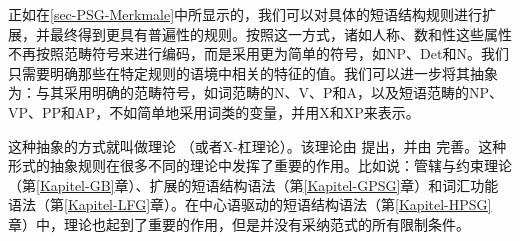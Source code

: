 正如在\ref{sec-PSG-Merkmale}中所显示的，我们可以对具体的短语结构规则进行扩展，并最终得到更具有普遍性的规则。按照这一方式，诸如人称、数和性这些属性不再按照范畴符号来进行编码，而是采用更为简单的符号，如NP、Det和N。我们只需要明确那些在特定规则的语境中相关的特征的值。我们可以进一步将其抽象为：与其采用明确的范畴符号，如词范畴的N、V、P和A，以及短语范畴的NP、VP、PP和AP，不如简单地采用词类的变量，并用X和XP来表示。

这种抽象的方式就叫做\xbarc 理论 （或者X-杠理论）。该理论由 \citet{Chomsky70a}提出，并由 \citet{Jackendoff77a}完善。这种形式的抽象规则在很多不同的理论中发挥了重要的作用。比如说：管辖与约束理论\indexgb（第\ref{Kapitel-GB}章）、扩展的短语结构语法\indexgpsg（第\ref{Kapitel-GPSG}章）和词汇功能语法\indexlfg（第\ref{Kapitel-LFG}章）。在中心语驱动的短语结构语法\indexhpsg（第\ref{Kapitel-HPSG}章）中，\xbarc 理论也起到了重要的作用，但是并没有采纳\xbarc 范式的所有限制条件。


